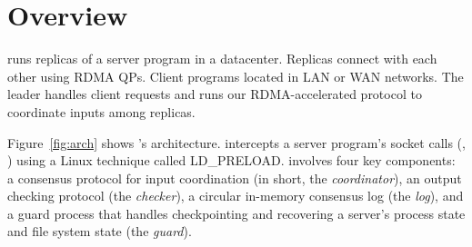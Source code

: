 
\section{\xxx Overview}\label{sec:overview}

 





\xxx runs replicas of a server program in a datacenter. Replicas connect with 
each other using RDMA QPs. Client programs located in LAN or WAN networks. The 
leader handles client requests and runs our RDMA-accelerated \paxos protocol to 
coordinate inputs among replicas.

Figure~\ref{fig:arch} shows \xxx's architecture. \xxx intercepts a server 
program's socket calls (\eg, \recv) using a Linux technique called LD\_PRELOAD. 
\xxx involves four key components: a \paxos consensus protocol for input 
coordination (in short, the \emph{coordinator}), an output checking protocol 
(the \emph{checker}), a circular in-memory consensus log (the 
\emph{log}), and a guard process that handles checkpointing and recovering a 
server's process state and file system state (the \emph{guard}).


